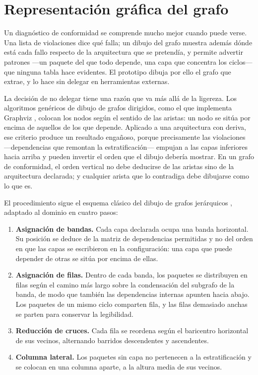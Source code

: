 \section{Representación gráfica del grafo}
\label{sec:visualizacion}
Un diagnóstico de conformidad se comprende mucho mejor cuando puede verse. Una lista de violaciones dice qué falla; un dibujo del grafo muestra además dónde está cada fallo respecto de la arquitectura que se pretendía, y permite advertir patrones ---un paquete del que todo depende, una capa que concentra los ciclos--- que ninguna tabla hace evidentes. El prototipo dibuja por ello el grafo que extrae, y lo hace sin delegar en herramientas externas.

La decisión de no delegar tiene una razón que va más allá de la ligereza. Los algoritmos genéricos de dibujo de grafos dirigidos, como el que implementa Graphviz \citep{Gansner1993}, colocan los nodos según el sentido de las aristas: un nodo se sitúa por encima de aquellos de los que depende. Aplicado a una arquitectura con deriva, ese criterio produce un resultado engañoso, porque precisamente las violaciones ---dependencias que remontan la estratificación--- empujan a las capas inferiores hacia arriba y pueden invertir el orden que el dibujo debería mostrar. En un grafo de conformidad, el orden vertical no debe deducirse de las aristas sino de la arquitectura declarada; y cualquier arista que lo contradiga debe dibujarse como lo que es.

El procedimiento sigue el esquema clásico del dibujo de grafos jerárquicos \citep{Sugiyama1981}, adaptado al dominio en cuatro pasos:

\begin{enumerate}
    \item \textbf{Asignación de bandas.} Cada capa declarada ocupa una banda horizontal. Su posición se deduce de la matriz de dependencias permitidas y no del orden en que las capas se escribieron en la configuración: una capa que puede depender de otras se sitúa por encima de ellas.
    \item \textbf{Asignación de filas.} Dentro de cada banda, los paquetes se distribuyen en filas según el camino más largo sobre la condensación del subgrafo de la banda, de modo que también las dependencias internas apunten hacia abajo. Los paquetes de un mismo ciclo comparten fila, y las filas demasiado anchas se parten para conservar la legibilidad.
    \item \textbf{Reducción de cruces.} Cada fila se reordena según el baricentro horizontal de sus vecinos, alternando barridos descendentes y ascendentes.
    \item \textbf{Columna lateral.} Los paquetes sin capa no pertenecen a la estratificación y se colocan en una columna aparte, a la altura media de sus vecinos.
\end{enumerate}

